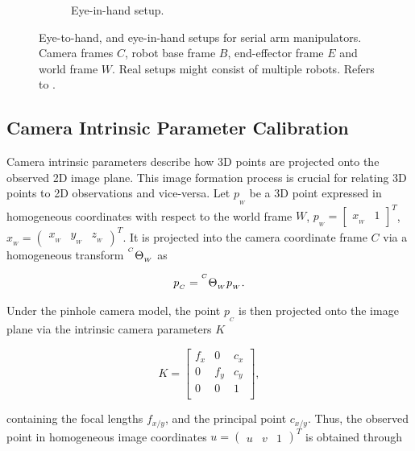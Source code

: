 \begin{figure}[tb]
\begin{subfigure}[b]{0.49\textwidth}
        \caption{Eye-in-hand setup.}
    \end{subfigure}
    \caption{Eye-to-hand, and eye-in-hand setups for serial arm manipulators. Camera frames $C$, robot base frame $B$, end-effector frame $E$ and world frame $W$. Real setups might consist of multiple robots. Refers to .}
    \label{in:fig:coordinate_frames}
\end{figure}

\subsection{Camera Intrinsic Parameter Calibration}
\label{in:sec:camera_intrinsic_calibration}
Camera intrinsic parameters describe how 3D points are projected onto the observed 2D image plane. This image formation process is crucial for relating 3D points to 2D observations and vice-versa. Let $p_{_W}$ be a 3D point expressed in homogeneous coordinates with respect to the world frame $W$, $p_{_W} = \begin{bmatrix}
    x_{_W} & 1
\end{bmatrix}^T$, $x_{_W} = \begin{pmatrix}
    x_{_W} & y_{_W} & z_{_W}
\end{pmatrix}^T$. It is projected into the camera coordinate frame $C$ via a homogeneous transform ${}^{^C}\Theta_{_W}$ as

\begin{equation}
    p_{_C} = {}^{^C}\Theta_{_W} p_{_W}.
\end{equation}

Under the pinhole camera model, the point $p_{_C}$ is then projected onto the image plane via the intrinsic camera parameters $K$

\begin{equation}
    K = \begin{bmatrix}
        f_x & 0 & c_x \\
        0 & f_y & c_y \\
        0 & 0 & 1 \\
    \end{bmatrix},
\end{equation}

containing the focal lengths $f_{x/y}$, and the principal point $c_{x/y}$. Thus, the observed point in homogeneous image coordinates $u = \begin{pmatrix}
    u & v & 1
\end{pmatrix}^T$ is obtained through


